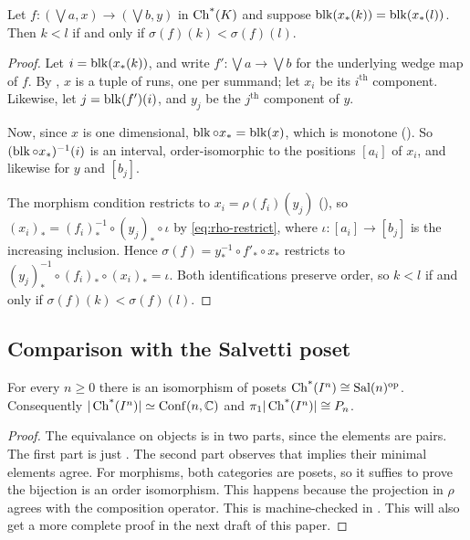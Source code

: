 \documentclass[11pt]{article}
\begin{document}
\begin{lemma}\label{lem:within-summand}
  Let $f : (\bigvee a, x) \to (\bigvee b, y)$ in $\operatorname{Ch^*}(K)$ and suppose
  $\operatorname{blk}(x_*(k)) = \operatorname{blk}(x_*(l))$. Then $k < l$ if and only if $\sigma(f)(k) < \sigma(f)(l)$.
\end{lemma} 
\begin{proof}
  Let $i = \operatorname{blk}(x_*(k))$, and write $f' : \bigvee a \to \bigvee b$ for the underlying wedge map of $f$.
  By , $x$ is a tuple of runs, one per summand; let $x_i$ be its
  $i^{\text{th}}$ component.
  Likewise, let $j = \operatorname{blk}(f')(i)$, and $y_j$ be the $j^{\text{th}}$ component of $y$.

  Now, since $x$ is one dimensional, $\operatorname{blk} \circ x_* = \operatorname{blk}(x)$, which is monotone (). 
  So $(\operatorname{blk} \circ x_*)^{-1}(i)$ is an interval, order-isomorphic to the positions
  $[a_i]$ of $x_i$, and likewise for $y$ and $[b_j]$.

  The morphism condition restricts to $x_i = \rho(f_i)(y_j)$ (), so
  $(x_i)_* = (f_i)_*^{-1} \circ (y_j)_* \circ \iota$ by \eqref{eq:rho-restrict}, where
  $\iota : [a_i] \to [b_j]$ is the increasing inclusion. Hence
  $\sigma(f) = y_*^{-1} \circ f'_* \circ x_*$ restricts
  to $(y_j)_*^{-1} \circ (f_i)_* \circ (x_i)_* = \iota$.
  Both identifications preserve order, so $k < l$ if and only if
  $\sigma(f)(k) < \sigma(f)(l)$.
\end{proof}

\subsection{Comparison with the Salvetti poset}

\begin{theorem}\label{thm:sal}
  For every $n \ge 0$ there is an isomorphism of posets $\operatorname{Ch^*}(I^{n}) \cong \operatorname{Sal}(n)^{\mathrm{op}}$.
  Consequently $|\operatorname{Ch^*}(I^{n})| \simeq \operatorname{Conf}(n,\mathbb{C})$ and $\pi_1|\operatorname{Ch^*}(I^{n})| \cong P_n$.
\end{theorem}
\begin{proof}
The equivalance on objects is in two parts, since the elements are pairs.
The first part is just . 
The second part observes that  implies their minimal elements 
agree.
For morphisms, both categories are posets, so it suffies to prove the bijection 
is an order isomorphism.
This happens because the projection in $\rho$ agrees with the composition operator.
This is machine-checked in \cite{Cubical}.
This will also get a more complete proof in the next draft of this paper.
\end{proof}
\end{document}
